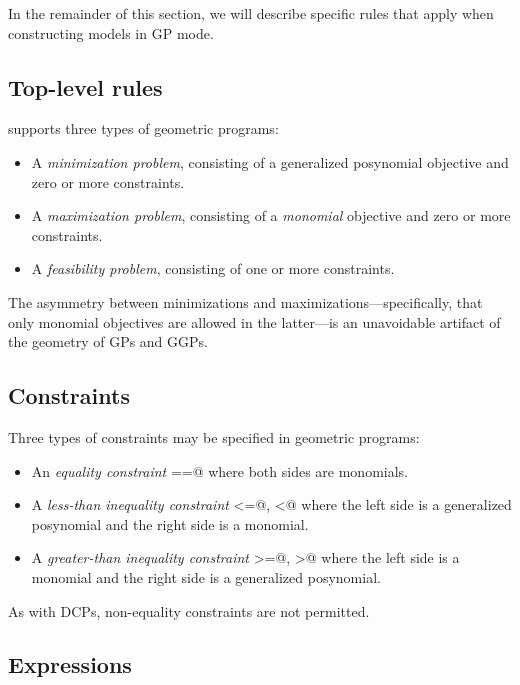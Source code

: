 \documentclass[12pt]{article}
\begin{document}
In the remainder of this section, we will describe specific rules
that apply when constructing models in GP mode.

\subsection{Top-level rules}

\cvx supports three types of geometric programs:
\begin{itemize}
\item A \emph{minimization problem}, consisting of a generalized posynomial objective and
zero or more constraints.
\item A \emph{maximization problem}, consisting of a \emph{monomial} objective and
zero or more constraints.
\item A \emph{feasibility problem}, consisting of one or more constraints.
\end{itemize}
The asymmetry between minimizations and maximizations---specifically, that only monomial
objectives are allowed in the latter---is an unavoidable artifact of
the geometry of GPs and GGPs.

\subsection{Constraints}

Three types of constraints may be specified in geometric programs:
\begin{itemize}
\item An \emph{equality constraint} \verb@==@ where both sides are monomials.
\item A \emph{less-than inequality constraint} \verb@<=@, \verb@<@ 
where the left side is a generalized posynomial and the right side is a monomial.
\item A \emph{greater-than inequality constraint} \verb@>=@, \verb@>@ 
where the left side is a monomial and the right side is a generalized posynomial.
\end{itemize}
As with DCPs, non-equality constraints are not permitted.

\subsection{Expressions}
\end{document}
